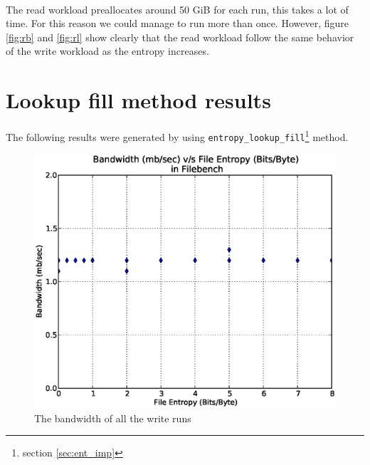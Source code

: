 \paragraph{}
The read workload preallocates around 50 GiB for each run, this takes a lot of time. For this reason we could manage to run more than once. However, figure \ref{fig:rb} and \ref{fig:rl} show clearly that the read workload follow the same behavior of the write workload as the entropy increases.

\section{Lookup fill method results}


The following results were generated by using \verb+entropy_lookup_fill+\footnote{section \ref{sec:ent_imp}} method.

\begin{figure}[H]
\begin{center}
\includegraphics[scale=.55]{../results/set2/write_bw_2.eps}
\caption{The bandwidth of all the write runs}
\label{fig:wb2}
\end{center}
\end{figure}

